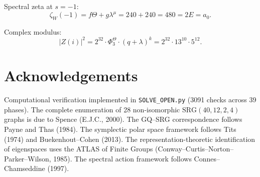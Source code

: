 \documentclass[12pt,a4paper]{article}
\theoremstyle{definition}
\newcommand{\SRG}{\mathrm{SRG}}
\newcommand{\Phithree}{\Phi_3}
\begin{document}
Spectral zeta at $s=-1$:
\begin{equation}
  \zeta_W(-1) = f\Theta+g\lambda^\mu = 240+240 = 480 = 2E = a_0.
\end{equation}

Complex modulus:
\begin{equation}
  |Z(i)|^2 = 2^{32}\cdot\Phithree^{\Theta}\cdot(q+\lambda)^k
           = 2^{32}\cdot 13^{10}\cdot 5^{12}.
\end{equation}


\section*{Acknowledgements}

Computational verification implemented in \texttt{SOLVE\_OPEN.py}
(3091 checks across 39 phases).
The complete enumeration of 28 non-isomorphic $\SRG(40,12,2,4)$ graphs
is due to Spence (E.J.C., 2000).
The GQ--SRG correspondence follows Payne and Thas (1984).
The symplectic polar space framework follows Tits (1974) and
Buekenhout--Cohen (2013).
The representation-theoretic identification of eigenspaces uses the
ATLAS of Finite Groups (Conway--Curtis--Norton--Parker--Wilson, 1985).
The spectral action framework follows Connes--Chamseddine (1997).
\end{document}
